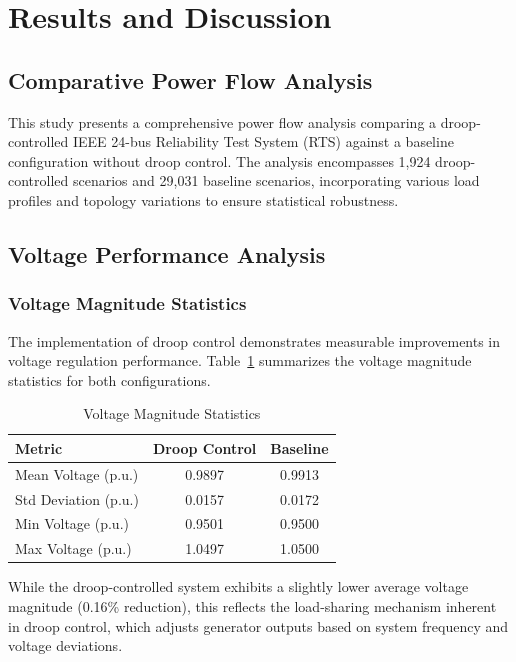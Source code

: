 
\section{Results and Discussion}

\subsection{Comparative Power Flow Analysis}

This study presents a comprehensive power flow analysis comparing a droop-controlled IEEE 24-bus Reliability Test System (RTS) against a baseline configuration without droop control. The analysis encompasses 1,924 droop-controlled scenarios and 29,031 baseline scenarios, incorporating various load profiles and topology variations to ensure statistical robustness.

\subsection{Voltage Performance Analysis}

\subsubsection{Voltage Magnitude Statistics}

The implementation of droop control demonstrates measurable improvements in voltage regulation performance. Table~\ref{tab:voltage_stats} summarizes the voltage magnitude statistics for both configurations.

\begin{table}[htbp]
\centering
\caption{Voltage Magnitude Statistics}
\label{tab:voltage_stats}
\begin{tabular}{lcc}
\hline
\textbf{Metric} & \textbf{Droop Control} & \textbf{Baseline} \\
\hline
Mean Voltage (p.u.) & 0.9897 & 0.9913 \\
Std Deviation (p.u.) & 0.0157 & 0.0172 \\
Min Voltage (p.u.) & 0.9501 & 0.9500 \\
Max Voltage (p.u.) & 1.0497 & 1.0500 \\
\hline
\end{tabular}
\end{table}

While the droop-controlled system exhibits a slightly lower average voltage magnitude (0.16\% reduction), this reflects the load-sharing mechanism inherent in droop control, which adjusts generator outputs based on system frequency and voltage deviations.

